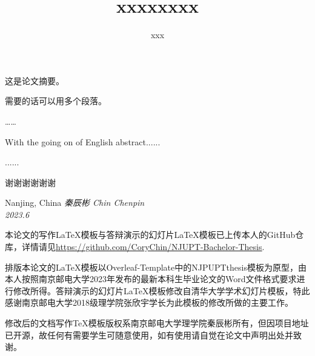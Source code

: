 \documentclass[bachelor]{njupthesis}
\title{xxxxxxxx}
\author{xxx}
\begin{document}

\makecover

\begin{chineseabstract}
这是论文摘要。 

需要的话可以用多个段落。

……

\chinesekeyword{}
\end{chineseabstract}

\begin{englishabstract}
With the going on of English abstract......

......

\englishkeyword{}
\end{englishabstract}

\thesistableofcontents%

\thesischapterexordium




\thesisacknowledgement

谢谢谢谢谢谢

\vspace{\baselineskip}
\begin{flushright}\noindent
Nanjing, China \hfill {\it 秦辰彬 Chin Chenpin}\\
\hfill {\it 2023.6}
\end{flushright}




%
% 
%
% 
% 
%

\thesisappendix
本论文的写作\LaTeX 模板与答辩演示的幻灯片\LaTeX 模板已上传本人的GitHub仓库，详情请见\underline{\url{https://github.com/CoryChin/NJUPT-Bachelor-Thesis}}. 

排版本论文的\LaTeX 模板以Overleaf-Template中的NJPUPTthesis模板为原型，由本人按照南京邮电大学2023年发布的最新本科生毕业论文的Word文件格式要求进行修改所得。答辩演示的幻灯片\LaTeX 模板修改自清华大学学术幻灯片模板，特此感谢南京邮电大学2018级理学院张欣宇学长为此模板的修改所做的主要工作。

修改后的文档写作\TeX 模板版权系南京邮电大学理学院秦辰彬所有，但因项目地址已开源，故任何有需要学生可随意使用，如有使用请自觉在论文中声明出处并致谢。
\end{document}
